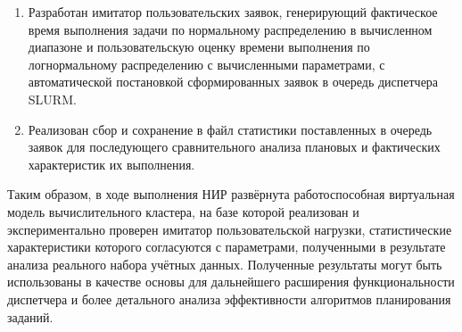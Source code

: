 \begin{enumerate}
\item Разработан имитатор пользовательских заявок, генерирующий
фактическое время выполнения задачи по нормальному распределению в
вычисленном диапазоне и пользовательскую оценку времени выполнения по
логнормальному распределению с вычисленными параметрами, с
автоматической постановкой сформированных заявок в очередь диспетчера
SLURM.

\item Реализован сбор и сохранение в файл статистики поставленных в
очередь заявок для последующего сравнительного анализа плановых и
фактических характеристик их выполнения.
\end{enumerate}

Таким образом, в ходе выполнения НИР развёрнута работоспособная
виртуальная модель вычислительного кластера, на базе которой
реализован и экспериментально проверен имитатор пользовательской
нагрузки, статистические характеристики которого согласуются с
параметрами, полученными в результате анализа реального набора учётных
данных. Полученные результаты могут быть использованы в качестве
основы для дальнейшего расширения функциональности диспетчера и более
детального анализа эффективности алгоритмов планирования заданий.